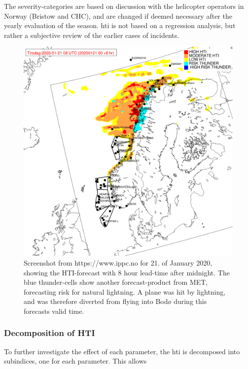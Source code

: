 The severity-categories are based on discussion with the helicopter operators in Norway (Bristow and CHC), and are changed if deemed necessary after the yearly evaluation of the season. \acrshort{hti} is not based on a regression analysis, but rather a subjective review of the earlier cases of incidents.
\begin{figure}
    \centering
    \includegraphics[width=\textwidth]{Figures/hti.png}
    \caption{Screenshot from https://www.ippc.no for 21. of January 2020, showing the HTI-forecast with 8 hour lead-time after midnight. The blue thunder-cells show another forecast-product from MET, forecasting risk for natural lightning. A plane was hit by lightning, and was therefore diverted from flying into Bodø during this forecasts valid time. }
    \label{fig:hti}
\end{figure}

\subsubsection{Decomposition of HTI}\label{decomposition}

To further investigate the effect of each parameter, the \acrshort{hti} is decomposed into subindices, one for each parameter. This allows 